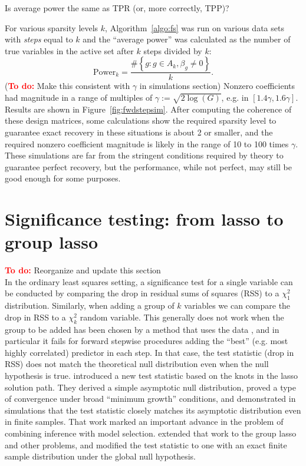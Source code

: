 \documentclass{imsart}
\newcommand{\todo}{\textcolor{red}{\textbf{To do: }}}
\newcommand{\jonathan}[1]{{\color{blue}  #1}}
\begin{document}
\jonathan{Is average power the same as TPR (or, more correctly, TPP)?}


For various sparsity levels $k$, Algorithm~\ref{algo:fs} was run on
various data sets with \textit{steps} equal to $k$ and the ``average
power'' was calculated as the number of true variables in the active
set after $k$ steps divided by $k$:
$$
\text{Power}_k = \frac{\# \left\{g: g \in A_k, \beta_g \neq 0\right\}}{k}.
$$ (\todo Make this consistent with
$\gamma$ in simulations section)
Nonzero coefficients had magnitude
in a range of multiples of $\gamma := \sqrt{2\log(G)}$, e.g. in $[1.4
\gamma, 1.6 \gamma]$. Results are shown in
Figure~\ref{fig:fwdstepsim}. After computing the
coherence of these design matrices, some calculations show the required
sparsity level to guarantee exact recovery in these situations is
about 2 or smaller, and the required nonzero coefficient magnitude is
likely in the range of 10 to 100 times $\gamma$. These simulations are far
from the stringent conditions required by theory to guarantee perfect
recovery, but the performance, while not perfect, may still be good
enough for some purposes.




\section{Significance testing: from lasso to group lasso}
\label{sec:testing}

\todo Reorganize and update this section \\

In the ordinary least squares setting, a significance test for a
single variable can be conducted by comparing the drop in residual
sums of squares (RSS) to a $\chi^2_1$ distribution. Similarly, when
adding a group of $k$ variables we can compare the drop in RSS to a
$\chi^2_k$ random variable. This generally does not work when the
group to be added has been chosen by a method that uses the data \cite{olshen:flevel},
and in particular it fails for forward stepwise procedures adding
the ``best'' (e.g. most highly correlated) predictor in each step. In
that case, the test statistic (drop in RSS) does not match the
theoretical null distribution even when the null hypothesis is
true. \cite{significance:lasso} introduced a new test statistic based
on the knots in the lasso solution path. They derived a simple
asymptotic null distribution, proved a type of convergence under broad
``minimum growth'' conditions, and demonstrated in simulations that
the test statistic closely matches its asymptotic distribution even in
finite samples.  That work marked an important advance in the problem
of combining inference with model selection.  \cite{tests:adaptive}
extended that work to the group lasso \citep{grouplasso} and other
problems, and modified the test statistic to one with an exact finite
sample distribution under the global null hypothesis.
\end{document}
